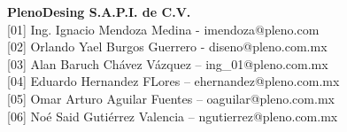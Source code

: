 \def\vhhistoryname{Revisión}%
\def\vhversionname{Versión}%
\def\vhdatename{Fecha}%
\def\vhauthorname{Autor}%
\def\vhchangename{Descripción}%

\begin{versionhistory}
\end{versionhistory}

\vfill 

\noindent\large\textbf{PlenoDesing S.A.P.I. de C.V.}\\

\noindent\normalsize [01] Ing. Ignacio Mendoza Medina - imendoza@pleno.com\\
\noindent\normalsize [02] Orlando Yael Burgos Guerrero - diseno@pleno.com.mx\\
\noindent\normalsize [03] Alan Baruch Chávez Vázquez – ing\_01@pleno.com.mx\\
\noindent\normalsize [04] Eduardo Hernandez FLores – ehernandez@pleno.com.mx\\
\noindent\normalsize [05] Omar Arturo Aguilar Fuentes – oaguilar@pleno.com.mx\\
\noindent\normalsize [06] Noé Said Gutiérrez Valencia – ngutierrez@pleno.com.mx\\


